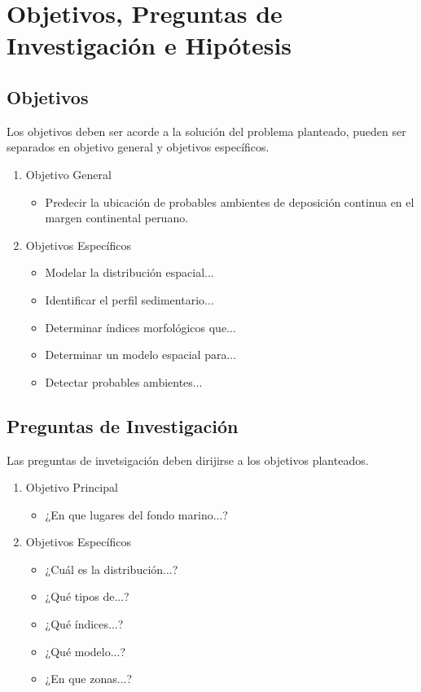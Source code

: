 \section{Objetivos, Preguntas de Investigación e Hipótesis}

\subsection{Objetivos}

Los objetivos deben ser acorde a la solución del problema planteado, pueden ser separados en objetivo general y objetivos específicos.

\begin{enumerate}

\item Objetivo General
\begin{itemize}
\item Predecir la ubicación de probables ambientes de deposición continua en el margen continental peruano.
\end{itemize}

\item Objetivos Específicos
\begin{itemize}
\item Modelar la distribución espacial...
\item Identificar el perfil sedimentario...
\item Determinar índices morfológicos que...
\item Determinar un modelo espacial para...
\item Detectar probables ambientes...
\end{itemize}

\end{enumerate}


\subsection{Preguntas de Investigación}

Las preguntas de invetsigación deben dirijirse a los objetivos planteados.

\begin{enumerate}

\item Objetivo Principal
\begin{itemize}
\item ¿En que lugares del fondo marino...?
\end{itemize}

\item Objetivos Específicos
\begin{itemize}
\item ¿Cuál es la distribución...?
\item ¿Qué tipos de...?
\item ¿Qué índices...?
\item ¿Qué modelo...?
\item ¿En que zonas...?
\end{itemize}

\end{enumerate}

